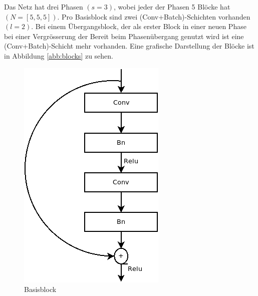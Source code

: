 Das Netz hat drei Phasen $(s=3)$, wobei jeder der Phasen 5 Blöcke hat $(N=[5,5,5])$. Pro Basisblock sind zwei (Conv+Batch)-Schichten vorhanden $(l=2)$. Bei einem Übergangsblock, der als erster Block in einer neuen Phase bei einer Vergrösserung der Bereit beim Phasenübergang genutzt wird ist eine (Conv+Batch)-Schicht mehr vorhanden. Eine grafische Darstellung der Blöcke ist in Abbildung \ref{abb:blocks} zu sehen.




\begin{figure}[]
   \begin{minipage}[b]{.4\linewidth} %
      \includegraphics[width=0.8\linewidth]{KapitelPartB/Images/Basisblock.png}
      \caption{Basisblock}
   \end{minipage}
   \hspace{.1\linewidth}%
   \begin{minipage}[b]{.4\linewidth} %

\end{minipage}
\end{figure}
